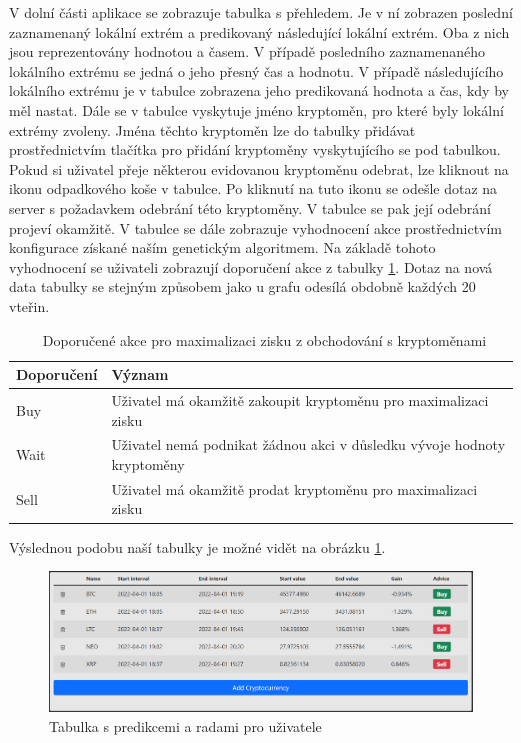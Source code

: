 V dolní části aplikace se zobrazuje tabulka s přehledem. 
Je v ní zobrazen poslední zaznamenaný lokální extrém a predikovaný následující lokální extrém. 
Oba z nich jsou reprezentovány hodnotou a časem. 
V případě posledního zaznamenaného lokálního extrému se jedná o jeho přesný čas a hodnotu. 
V případě následujícího lokálního extrému je v tabulce zobrazena jeho predikovaná hodnota a čas, kdy by měl nastat. 
Dále se v tabulce vyskytuje jméno kryptoměn, pro které byly lokální extrémy zvoleny. 
Jména těchto kryptoměn lze do tabulky přidávat prostřednictvím tlačítka pro přidání kryptoměny vyskytujícího se pod tabulkou. 
Pokud si uživatel přeje některou evidovanou kryptoměnu odebrat, lze kliknout na ikonu odpadkového koše v tabulce. 
Po kliknutí na tuto ikonu se odešle dotaz na server s požadavkem odebrání této kryptoměny. 
V tabulce se pak její odebrání projeví okamžitě. V tabulce se dále zobrazuje vyhodnocení akce prostřednictvím konfigurace získané naším genetickým algoritmem. 
Na základě tohoto vyhodnocení se uživateli zobrazují doporučení akce z tabulky \ref{advice}. 
Dotaz na nová data tabulky se stejným způsobem jako u grafu odesílá obdobně každých 20 vteřin. 
\begin{table}\centering
\caption{~Doporučené akce pro maximalizaci zisku z obchodování s kryptoměnami}\label{advice}
\begin{tabular}{l|l}
    Doporučení & Význam	\tabularnewline \hline 
     Buy		    & Uživatel má okamžitě zakoupit kryptoměnu pro maximalizaci zisku	\tabularnewline \hline
     Wait		    & Uživatel nemá podnikat žádnou akci v důsledku vývoje hodnoty kryptoměny	\tabularnewline \hline
     Sell       	& Uživatel má okamžitě prodat kryptoměnu pro maximalizaci zisku	\tabularnewline 
\end{tabular}
\end{table}

Výslednou podobu naší tabulky je možné vidět na obrázku \ref{visual:table}.

\begin{figure}
    \caption{Tabulka s predikcemi a radami pro uživatele}
    \label{visual:table}
    \centering
    \includegraphics[width=\textwidth]{table.png}
\end{figure}

